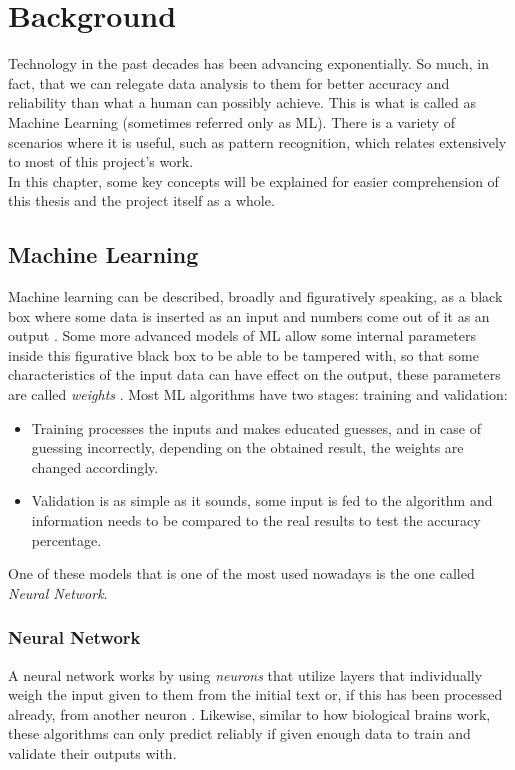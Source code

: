 \chapter{Background}
\label{ch2}
Technology in the past decades has been advancing exponentially. So much, in fact, that we can relegate data analysis to them for better accuracy and reliability than what a human can possibly achieve. This is what is called as Machine Learning (sometimes referred only as ML).
There is a variety of scenarios where it is useful, such as pattern recognition, which relates extensively to most of this project's work.\\
In this chapter, some key concepts will be explained for easier comprehension of this thesis and the project itself as a whole.

\section{Machine Learning}
Machine learning can be described, broadly and figuratively speaking, as a black box where some data is inserted as an input and numbers come out of it as an output \citep{rf8}.
Some more advanced models of ML allow some internal parameters inside this figurative black box to be able to be tampered with, so that some characteristics of the input data can have effect on the output, these parameters are called \textit{weights} \citep{rf9}.
Most ML algorithms have two stages: training and validation:
\begin{itemize}
\item Training processes the inputs and makes educated guesses, and in case of guessing incorrectly, depending on the obtained result, the weights are changed accordingly.
\item Validation is as simple as it sounds, some input is fed to the algorithm and information needs to be compared to the real results to test the accuracy percentage.
\end{itemize}
One of these models that is one of the most used nowadays is the one called \textit{Neural Network}.

\subsection{Neural Network}
A neural network works by using \textit{neurons} that utilize layers that individually weigh the input given to them from the initial text or, if this has been processed already, from another neuron \citep{rf9}.
Likewise, similar to how biological brains work, these algorithms can only predict reliably if given enough data to train and validate their outputs with.

